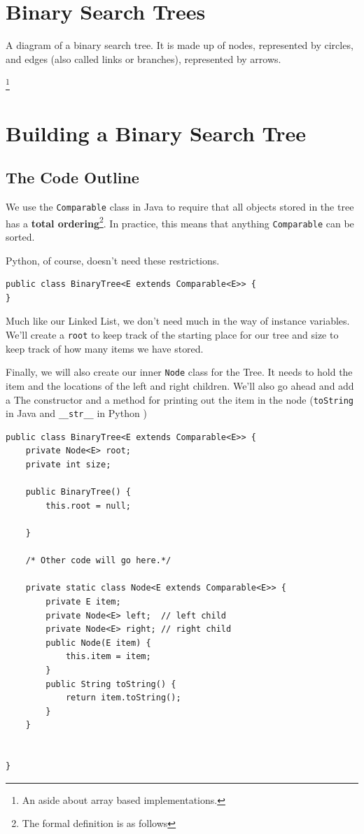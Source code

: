 \documentclass[10pt,a4paper]{book}
\begin{document}
\section{Binary Search Trees}

A diagram of a binary search tree.  It is made up of nodes, represented by circles, and edges (also called links or branches), represented by arrows.  


\footnote{An aside about array based implementations.}

\section{Building a Binary Search Tree}

\subsection{The Code Outline}


We use the \texttt{Comparable} class in Java to require that all objects stored in the tree has a \textbf{total ordering}\footnote{The formal definition is as follows}.%
In practice, this means that anything \texttt{Comparable} can be sorted.

Python, of course, doesn't need these restrictions.
\begin{verbatim}
public class BinaryTree<E extends Comparable<E>> {
}
\end{verbatim}




Much like our Linked List, we don't need much in the way of instance variables.  We'll create a \texttt{root} to keep track of the starting place for our tree and size to keep track of how many items we have stored.

Finally, we will also create our inner \texttt{Node} class for the Tree.
It needs to hold the item and the locations of the left and right children.
We'll also go ahead and add a The constructor and a method for printing out the item in the node (\texttt{toString} in Java and \texttt{\_\_str\_\_} in Python )

\begin{verbatim}
public class BinaryTree<E extends Comparable<E>> {
	private Node<E> root;
	private int size;
	
	public BinaryTree() {
		this.root = null;
		
	}

	/* Other code will go here.*/

	private static class Node<E extends Comparable<E>> {
		private E item;
		private Node<E> left;  // left child
		private Node<E> right; // right child
		public Node(E item) {
			this.item = item;
		}
		public String toString() {
			return item.toString();
		}
	}

	
}
\end{verbatim}
\end{document}
